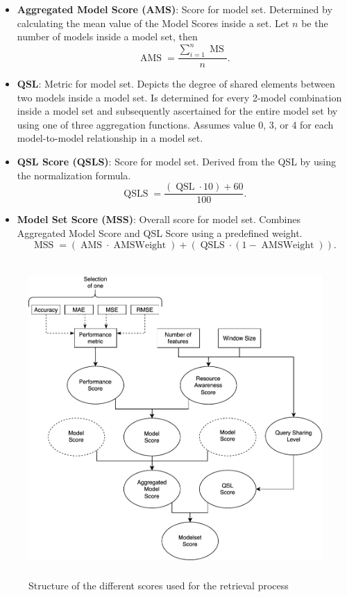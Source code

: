 \begin{itemize}
\item \textbf{Aggregated Model Score (AMS)}: Score for model set. Determined by calculating the mean value of the Model Scores inside a set. Let $n$ be the number of models inside a model set, then
\begin{equation}
  \operatorname{AMS} = \frac{\sum_{i=1}^{n} \operatorname{MS}}{n}.
  \label{ams}
  \end{equation}
  
\item \textbf{QSL}: Metric for model set. Depicts the degree of shared elements between two models inside a model set. Is determined for every 2-model combination inside a model set and subsequently ascertained for the entire model set by using one of three aggregation functions. Assumes value 0, 3, or 4 for each model-to-model relationship in a model set.

\item \textbf{QSL Score (QSLS)}: Score for model set. Derived from the QSL by using the normalization formula.
\begin{equation}
  \operatorname{QSLS} = \frac{(\operatorname{QSL} \cdot 10) + 60}{100}.
  \label{qsls}
  \end{equation}
  
\item \textbf{Model Set Score (MSS)}: Overall score for model set. Combines Aggregated Model Score and QSL Score using a predefined weight.
\begin{equation}
  \operatorname{MSS} = (\operatorname{AMS} \cdot \operatorname{AMSWeight}) + (\operatorname{QSLS} \cdot (1- \operatorname{AMSWeight})).
   \label{mss}
   \end{equation}
\end{itemize}


\begin{figure}[htb]
  \centering
\includegraphics[height=12cm]{graphics/scores.pdf}
  \caption{Structure of the different scores used for the retrieval process}
  \label{scoreconstruction}
\end{figure}



